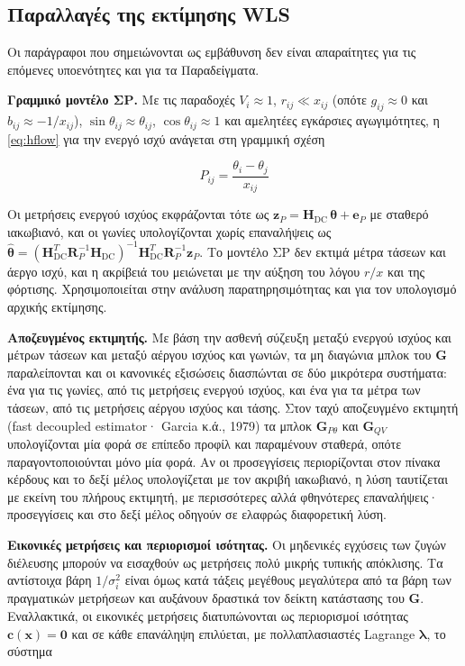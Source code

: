 \subsection{Παραλλαγές της εκτίμησης WLS}

Οι παράγραφοι που σημειώνονται ως εμβάθυνση δεν είναι απαραίτητες για τις επόμενες
υποενότητες και για τα Παραδείγματα.

\textbf{Γραμμικό μοντέλο ΣΡ.} Με τις παραδοχές $V_i \approx 1$, $r_{ij} \ll x_{ij}$ (οπότε
$g_{ij} \approx 0$ και $b_{ij} \approx -1/x_{ij}$), $\sin\theta_{ij} \approx \theta_{ij}$,
$\cos\theta_{ij} \approx 1$ και αμελητέες εγκάρσιες αγωγιμότητες, η \eqref{eq:hflow} για την
ενεργό ισχύ ανάγεται στη γραμμική σχέση

\begin{equation}
P_{ij} = \frac{\theta_i - \theta_j}{x_{ij}}
\label{eq:dcflow}
\end{equation}

Οι μετρήσεις ενεργού ισχύος εκφράζονται τότε ως $\mathbf{z}_P = \mathbf{H}_{\mathrm{DC}}\,
\boldsymbol{\theta} + \mathbf{e}_P$ με σταθερό ιακωβιανό, και οι γωνίες υπολογίζονται χωρίς
επαναλήψεις ως $\hat{\boldsymbol{\theta}} = (\mathbf{H}_{\mathrm{DC}}^{T}\mathbf{R}_P^{-1}
\mathbf{H}_{\mathrm{DC}})^{-1}\mathbf{H}_{\mathrm{DC}}^{T}\mathbf{R}_P^{-1}\mathbf{z}_P$. Το
μοντέλο ΣΡ δεν εκτιμά μέτρα τάσεων και άεργο ισχύ, και η ακρίβειά του μειώνεται με την αύξηση
του λόγου $r/x$ και της φόρτισης. Χρησιμοποιείται στην ανάλυση παρατηρησιμότητας και για
τον υπολογισμό αρχικής εκτίμησης.

\textbf{Αποζευγμένος εκτιμητής.} Με βάση την ασθενή σύζευξη μεταξύ ενεργού ισχύος και μέτρων
τάσεων και μεταξύ αέργου ισχύος και γωνιών, τα μη διαγώνια μπλοκ του $\mathbf{G}$ παραλείπονται
και οι κανονικές εξισώσεις διασπώνται σε δύο μικρότερα συστήματα: ένα για τις γωνίες, από
τις μετρήσεις ενεργού ισχύος, και ένα για τα μέτρα των τάσεων, από τις μετρήσεις αέργου
ισχύος και τάσης. Στον ταχύ αποζευγμένο εκτιμητή (fast decoupled estimator· Garcia κ.ά., 1979) τα μπλοκ
$\mathbf{G}_{P\theta}$ και $\mathbf{G}_{QV}$ υπολογίζονται μία φορά σε επίπεδο προφίλ και
παραμένουν σταθερά, οπότε παραγοντοποιούνται μόνο μία φορά. Αν οι προσεγγίσεις περιορίζονται
στον πίνακα κέρδους και το δεξί μέλος υπολογίζεται με τον ακριβή ιακωβιανό, η λύση ταυτίζεται
με εκείνη του πλήρους εκτιμητή, με περισσότερες αλλά φθηνότερες επαναλήψεις· προσεγγίσεις και
στο δεξί μέλος οδηγούν σε ελαφρώς διαφορετική λύση.

\textbf{Εικονικές μετρήσεις και περιορισμοί ισότητας.} Οι μηδενικές εγχύσεις των ζυγών
διέλευσης μπορούν να εισαχθούν ως μετρήσεις πολύ μικρής τυπικής απόκλισης. Τα αντίστοιχα βάρη
$1/\sigma_i^2$ είναι όμως κατά τάξεις μεγέθους μεγαλύτερα από τα βάρη των πραγματικών
μετρήσεων και αυξάνουν δραστικά τον δείκτη κατάστασης του $\mathbf{G}$. Εναλλακτικά, οι
εικονικές μετρήσεις διατυπώνονται ως περιορισμοί ισότητας $\mathbf{c}(\mathbf{x}) = \mathbf{0}$
και σε κάθε επανάληψη επιλύεται, με πολλαπλασιαστές Lagrange $\boldsymbol{\lambda}$, το σύστημα

